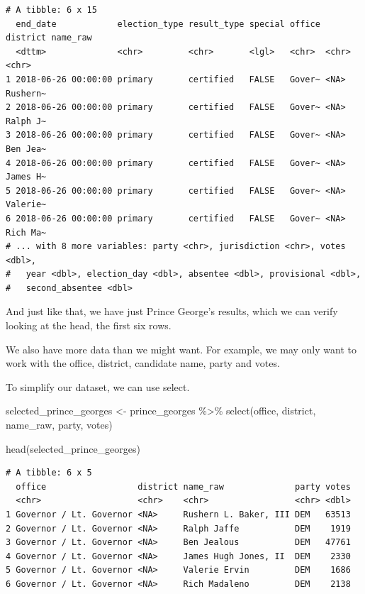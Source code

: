 \documentclass[
  letterpaper,
  DIV=11,
  numbers=noendperiod]{scrreprt}
\newenvironment{Shaded}{\begin{snugshade}}{\end{snugshade}}
\newcommand{\FunctionTok}[1]{\textcolor[rgb]{0.28,0.35,0.67}{#1}}
\newcommand{\NormalTok}[1]{\textcolor[rgb]{0.00,0.23,0.31}{#1}}
\newcommand{\OtherTok}[1]{\textcolor[rgb]{0.00,0.23,0.31}{#1}}
\newcommand{\SpecialCharTok}[1]{\textcolor[rgb]{0.37,0.37,0.37}{#1}}
\begin{document}
\begin{verbatim}
# A tibble: 6 x 15
  end_date            election_type result_type special office district name_raw
  <dttm>              <chr>         <chr>       <lgl>   <chr>  <chr>    <chr>   
1 2018-06-26 00:00:00 primary       certified   FALSE   Gover~ <NA>     Rushern~
2 2018-06-26 00:00:00 primary       certified   FALSE   Gover~ <NA>     Ralph J~
3 2018-06-26 00:00:00 primary       certified   FALSE   Gover~ <NA>     Ben Jea~
4 2018-06-26 00:00:00 primary       certified   FALSE   Gover~ <NA>     James H~
5 2018-06-26 00:00:00 primary       certified   FALSE   Gover~ <NA>     Valerie~
6 2018-06-26 00:00:00 primary       certified   FALSE   Gover~ <NA>     Rich Ma~
# ... with 8 more variables: party <chr>, jurisdiction <chr>, votes <dbl>,
#   year <dbl>, election_day <dbl>, absentee <dbl>, provisional <dbl>,
#   second_absentee <dbl>
\end{verbatim}

And just like that, we have just Prince George's results, which we can
verify looking at the head, the first six rows.

We also have more data than we might want. For example, we may only want
to work with the office, district, candidate name, party and votes.

To simplify our dataset, we can use select.

\begin{Shaded}
\begin{Highlighting}[]
\NormalTok{selected\_prince\_georges }\OtherTok{\textless{}{-}}\NormalTok{ prince\_georges }\SpecialCharTok{\%\textgreater{}\%} \FunctionTok{select}\NormalTok{(office, district, name\_raw, party, votes)}

\FunctionTok{head}\NormalTok{(selected\_prince\_georges)}
\end{Highlighting}
\end{Shaded}

\begin{verbatim}
# A tibble: 6 x 5
  office                  district name_raw              party votes
  <chr>                   <chr>    <chr>                 <chr> <dbl>
1 Governor / Lt. Governor <NA>     Rushern L. Baker, III DEM   63513
2 Governor / Lt. Governor <NA>     Ralph Jaffe           DEM    1919
3 Governor / Lt. Governor <NA>     Ben Jealous           DEM   47761
4 Governor / Lt. Governor <NA>     James Hugh Jones, II  DEM    2330
5 Governor / Lt. Governor <NA>     Valerie Ervin         DEM    1686
6 Governor / Lt. Governor <NA>     Rich Madaleno         DEM    2138
\end{verbatim}
\end{document}
